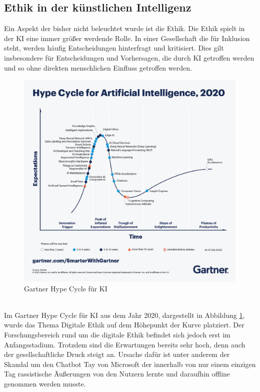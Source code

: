 \begin{onehalfspace}
    \subsection{Ethik in der künstlichen Intelligenz}
    \label{subsubsec:ethikinderKI}
        Ein Aspekt der bisher nicht beleuchtet wurde ist die Ethik. Die Ethik spielt in der \ac{KI} eine immer größer werdende Rolle. In einer Gesellschaft die für Inklusion steht, werden häufig Entscheidungen hinterfragt und kritisiert. Dies gilt insbesondere für Entscheidungen und Vorhersagen, die durch \ac{KI} getroffen werden und so ohne direkten menschlichen Einfluss getroffen werden.
        \begin{figure}[h]
            \centering
            \includegraphics[width = 14cm]{Bilder/Gartner_hypeCycle.png}
            \caption{Gartner Hype Cycle für \ac*{KI} \cite{Goasduff2020}}
            \label{fig:HypeCycle}
        \end{figure}
        \\
        Im Gartner Hype Cycle für \ac*{KI} aus dem Jahr 2020, dargestellt in Abbildung \ref*{fig:HypeCycle}, wurde das Thema Digitale Ethik auf dem Höhepunkt der Kurve platziert. Der Forschungsbereich rund um die digitale Ethik befindet sich jedoch erst im Anfangsstadium. Trotzdem sind die Erwartungen bereits sehr hoch, denn auch der gesellschaftliche Druck steigt an. Ursache dafür ist unter anderem der Skandal um den Chatbot Tay von Microsoft der innerhalb von nur einem einzigen Tag rassistische \"Außerungen von den Nutzern lernte und daraufhin offline genommen werden musste.\cite{Cremers2019}

\end{onehalfspace}
